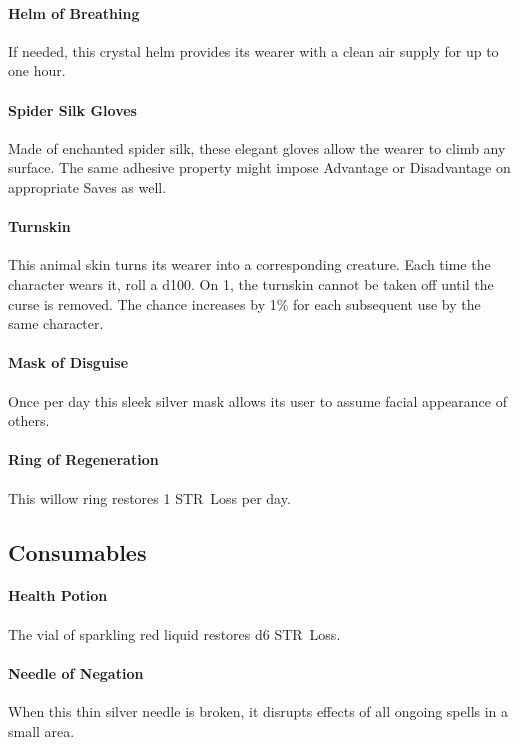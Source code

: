 \documentclass[itdr]{subfiles}
\begin{document}
\paragraph{Helm of Breathing}
If needed, this crystal helm provides its wearer with a clean air supply  for up to one hour.

\paragraph{Spider Silk Gloves}
Made of enchanted spider silk, these elegant gloves allow the wearer to climb any surface. The same adhesive property might impose Advantage or Disadvantage on appropriate Saves as well.

\paragraph{Turnskin}
This animal skin turns its wearer into a corresponding creature. Each time the character wears it, roll a d100. On 1, the turnskin cannot be taken off until the curse is removed. The chance increases by 1\% for each subsequent use by the same character.

\paragraph{Mask of Disguise}
Once per day this sleek silver mask allows its user to assume facial appearance of others.

\paragraph{Ring of Regeneration}
This willow ring restores 1 STR~Loss per day.



\subsection*{Consumables}

\paragraph{Health Potion}
The vial of sparkling red liquid restores d6 STR~Loss.

\paragraph{Needle of Negation}
When this thin silver needle is broken, it disrupts effects of all ongoing spells in a small area.
\end{document}
